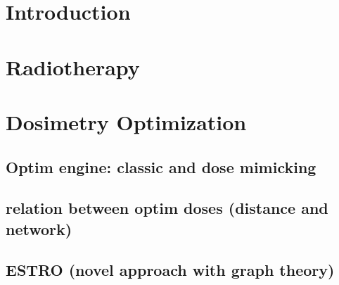 \documentclass[a4paper]{book}
\begin{document}
	
	
	
	
	
	
	
	\listoffigures
	\listoftables
	\tableofcontents
	\chapterStyleToC
	
	\chapter{Introduction}
	\begin{chapterabstract}
		
	\end{chapterabstract}
	\clearpage
	\localtableofcontents
	
	
	\chapter{Radiotherapy}
	\begin{chapterabstract}
		
	\end{chapterabstract}
	\clearpage
	\localtableofcontents
	
	
	\chapter{Dosimetry Optimization}
	\begin{chapterabstract}
	\end{chapterabstract}
	\clearpage
	\localtableofcontents
	\section{Optim engine: classic and dose mimicking}
	\section{relation between optim doses (distance and network)}
	\section{ESTRO (novel approach with graph theory)}
	
\end{document}
